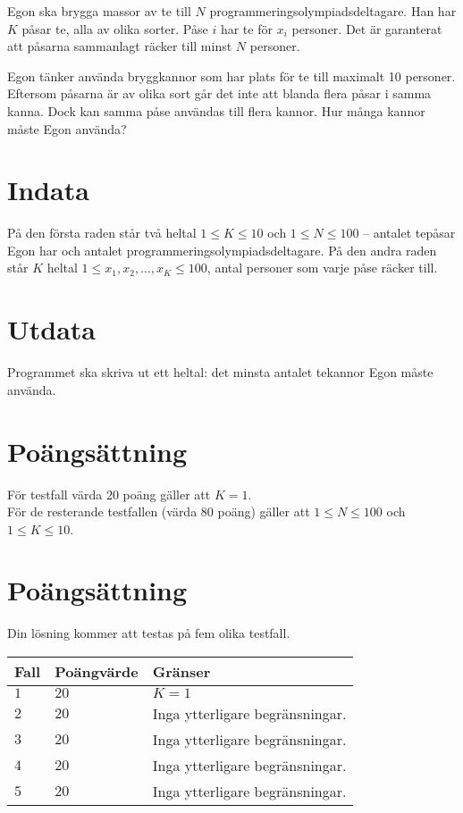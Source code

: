 Egon ska brygga massor av te till $N$ programmeringsolympiadsdeltagare.
Han har $K$ påsar te, alla av olika sorter.
Påse $i$ har te för $x_i$ personer.
Det är garanterat att påsarna sammanlagt räcker till minst $N$ personer.

Egon tänker använda bryggkannor som har plats för te till maximalt 10 personer.
Eftersom påsarna är av olika sort
går det inte att blanda flera påsar i samma kanna.
Dock kan samma påse användas till flera kannor.
Hur många kannor måste Egon använda?

\section*{Indata}
På den första raden står två heltal $1 \le K \le 10$ och $1 \le N \le 100$ 
 -- antalet tepåsar Egon har och antalet programmeringsolympiadsdeltagare. 
På den andra raden står $K$ heltal $1 \le x_1, x_2, \dots, x_K \le 100$,
antal personer som varje påse räcker till.

\section*{Utdata}
Programmet ska skriva ut ett heltal: det minsta antalet tekannor Egon måste använda. 

\section*{Poängsättning}
För testfall värda $20$ poäng gäller att $K=1$. \\
För de resterande testfallen (värda $80$ poäng) gäller att $1\leq N\leq 100$ och $1\leq K\leq 10$.

\section*{Poängsättning}
Din lösning kommer att testas på fem olika testfall.

\noindent
\begin{tabular}{| l | l | l |}
  \hline
  Fall & Poängvärde & Gränser \\ \hline
  $1$    & $20$        &  $K = 1$\\ \hline 
  $2$    & $20$        &  Inga ytterligare begränsningar. \\ \hline
  $3$    & $20$        &  Inga ytterligare begränsningar. \\ \hline
  $4$    & $20$        &  Inga ytterligare begränsningar. \\ \hline
  $5$    & $20$        &  Inga ytterligare begränsningar. \\ \hline
\end{tabular}


